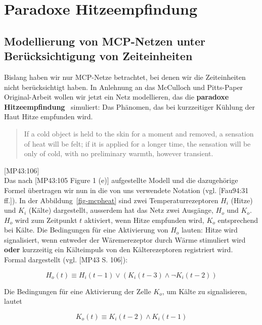 \chapter{Paradoxe Hitzeempfindung}\label{appendix:paradoxehitzeempfindung}
\section*{Modellierung von MCP-Netzen unter Berücksichtigung von Zeiteinheiten}

Bislang haben wir nur MCP-Netze betrachtet, bei denen wir die Zeiteinheiten nicht berücksichtigt haben. In Anlehnung an das McCulloch und Pitts-Paper Original-Arbeit wollen wir jetzt ein Netz modellieren, das die \textbf{paradoxe Hitzeempfindung}~\cite{HVKJ82} simuliert: Das Phänomen, das bei kurzzeitiger Kühlung der Haut Hitze empfunden wird.\\

\blockquote{
    If a cold object is held to the skin for a moment and removed, a sensation of heat will be felt; if it is applied for a longer time, the sensation will be only of cold, with no preliminary warmth, however transient.
}[MP43:106]\\

Das nach [MP43:105 Figure 1 (e)] aufgestellte Modell und die dazugehörige Formel übertragen wir nun in die von uns verwendete Notation (vgl. [Fau94:31 ff.]). In der Abbildung~\ref{fig-mcpheat} sind zwei Temperaturrezeptoren $H_i$ (Hitze) und $K_i$ (Kälte) dargestellt, ausserdem hat das Netz zwei Ausgänge, $H_o$ und $K_o$. $H_o$ wird zum Zeitpunkt $t$ aktiviert, wenn Hitze empfunden wird, $K_o$ entsprechend bei Kälte.
\noindent
Die Bedingungen für eine Aktivierung von $H_o$ lauten: Hitze wird signalisiert, wenn entweder der Wäremerezeptor durch Wärme stimuliert wird \textbf{oder} kurzzeitig ein Kälteimpuls von den Kälterezeptoren registriert wird.\\

Formal dargestellt (vgl. [MP43 S. 106]):

\begin{equation}
    H_o(t) \equiv H_i(t-1) \lor (K_i(t-3) \land \neg K_i(t - 2))
    \label{eq:gl-heat}
\end{equation}

Die Bedingungen für eine Aktivierung der Zelle $K_o$, um Kälte zu signalisieren, lautet


\begin{equation}
    K_o(t) \equiv K_i(t-2) \land K_i(t-1)
    \label{eq:gl-cold}
\end{equation}

